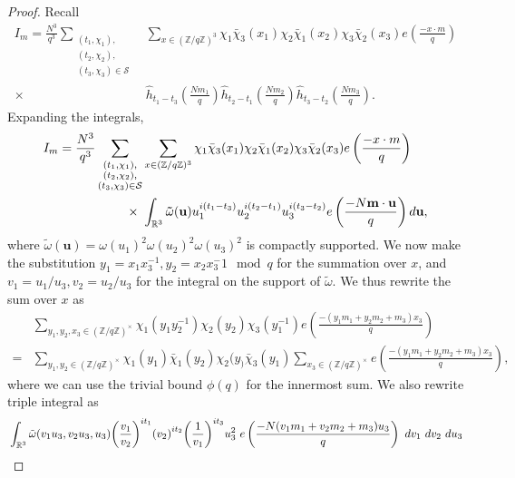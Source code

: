     \begin{proof}
        
    Recall
    \begin{align*}
        I_m=\frac{N^3}{q^3}\sum_{\substack{(t_1,\chi_1),\\(t_2,\chi_2),\\(t_3,\chi_3)\in\mathcal{S}}} &\sum_{x\in (\mathbb{Z}/q\mathbb{Z})^3}\chi_1\bar{\chi}_3(x_1)\chi_2\bar{\chi}_1(x_2)\chi_3\bar{\chi}_2(x_3) e\left(\frac{-x\cdot m}{q}\right)\\
        \times \ &\hat{h}_{t_1-t_3}\left(\frac{Nm_1}{q}\right)\hat{h}_{t_2-t_1}\left(\frac{Nm_2}{q}\right)\hat{h}_{t_3-t_2}\left(\frac{Nm_3}{q}\right).
    \end{align*}
    Expanding the integrals, 
    \begin{align*}
        I_m=\frac{N^3}{q^3}\sum_{\substack{(t_1,\chi_1),\\(t_2,\chi_2),\\(t_3,\chi_3)\in\mathcal{S}}} &\sum_{x\in (\mathbb{Z}/q\mathbb{Z})^3}\chi_1\bar{\chi}_3(x_1)\chi_2\bar{\chi}_1(x_2)\chi_3\bar{\chi}_2(x_3) e\left(\frac{-x\cdot m}{q}\right)\\
        \times \ &
        \int_{\mathbb{R}^3}\mathbf{\tilde{\omega}}(\mathbf{u})u_1^{i(t_1-t_3)}u_2^{i(t_2-t_1)}u_3^{i(t_3-t_2)}e\left(\frac{-N\mathbf{m}\cdot \mathbf{u}}{q}\right)d\mathbf{u},
    \end{align*}
    where $\tilde{\omega}(\mathbf{u})=\omega(u_1)^2\omega(u_2)^2\omega(u_3)^2$ is compactly supported.
    We now make the substitution $y_1=x_1x_3^{-1}, y_2=x_2x_3^-1 \mod q$ for the summation over $x$, and $v_1=u_1/u_3,v_2=u_2/u_3$ for the integral on the support of $\tilde{\omega}$.
    We thus rewrite the sum over $x$ as 
    \begin{align*}
        &\sum_{y_1,y_2,x_3\in (\mathbb{Z}/q\mathbb{Z})^\times}
        \chi_1(y_1y_2^{-1})\chi_2(y_2)\chi_3(y_1^{-1})e\left(\frac{-(y_1m_1+y_2m_2+m_3)x_3}{q}\right)\\
        =&
        \sum_{y_1,y_2\in (\mathbb{Z}/q\mathbb{Z})^\times}\chi_1(y_1)\bar{\chi}_1(y_2)\chi_2(y_)\bar{\chi}_3(y_1)\sum_{x_3\in (\mathbb{Z}/q\mathbb{Z})^\times}e\left(\frac{-(y_1m_1+y_2m_2+m_3)x_3}{q}\right),
    \end{align*}
    where we can use the trivial bound $\phi(q)$ for the innermost sum.
    We also rewrite triple integral as 
    \begin{align*}
        &\int_{\reals^3}\tilde{\omega}(v_1u_3,v_2u_3,u_3) {\left(\frac{v_1}{v_2}\right)}^{it_1} {\left(v_2\right)}^{it_2}{\left(\frac{1}{v_1}\right)}^{it_3} u_3^2 \ e\left(\frac{-N(v_1m_1+v_2m_2+m_3)u_3}{q}\right)\ dv_1\ dv_2\ du_3\\

\end{align*}
\end{proof}
